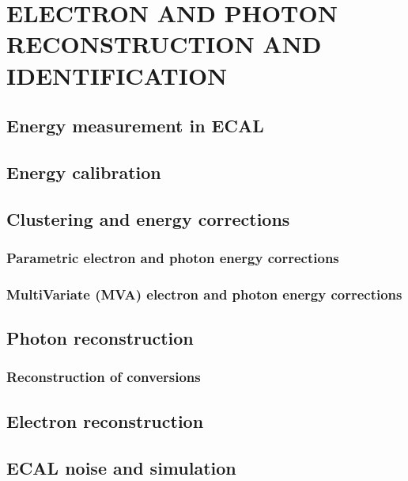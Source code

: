 
\chapter{ELECTRON AND PHOTON RECONSTRUCTION AND IDENTIFICATION}
\section{Energy measurement in ECAL}
\section{Energy calibration}
\section{Clustering and energy corrections}
\subsection{Parametric electron and photon energy corrections}
\subsection{MultiVariate (MVA) electron and photon energy corrections}
\section{Photon reconstruction}
\subsection{Reconstruction of conversions}
\section{Electron reconstruction}
\section{ECAL noise and simulation}
